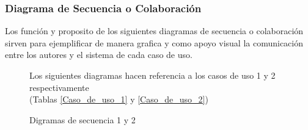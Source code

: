 \subsubsection{Diagrama de Secuencia o Colaboración}
Los función y proposito de los siguientes diagramas de secuencia o colaboración sirven para ejemplificar de manera grafica y como apoyo visual la comunicación entre los autores y el sistema de cada caso de uso.
\begin{figure}[H]
	\centering
	Los siguientes diagramas hacen referencia a los casos de uso 1 y 2 respectivamente\\(Tablas \ref{Caso_de_uso_1} y \ref{Caso_de_uso_2})
 	\caption{Digramas de secuencia 1 y 2}
\end{figure}

